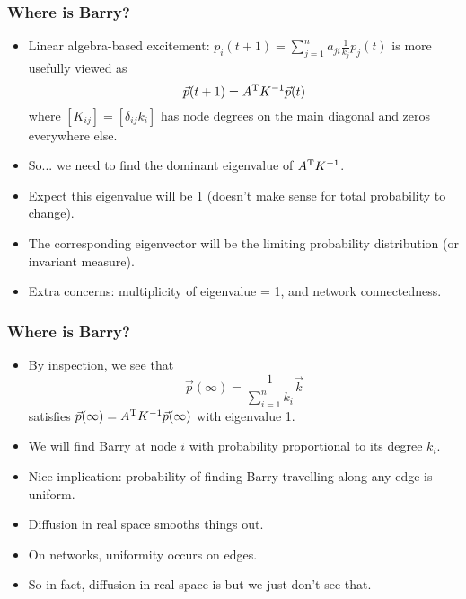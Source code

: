 \begin{frame}
  \frametitle{Where is Barry?}

  \begin{itemize}
  \item<1->
    Linear algebra-based excitement:
    $
    p_i(t+1) = \sum_{j=1}^{n} a_{ji} \frac{1}{k_j} p_j(t)
    $
    is more usefully viewed as
    $$
    \vec{p}(t+1) 
    = 
    A^{\textnormal{T}} K^{-1}
    \vec{p}(t) 
    $$
    where $[K_{ij}] = [\delta_{ij} k_i]$ 
    has node degrees on the main diagonal
    and zeros everywhere else.
  \item<2->
    So... we need to find the \alert{dominant eigenvalue} 
    of $A^{\textnormal{T}} K^{-1}$.
  \item<3->
    Expect this eigenvalue will be 1 (doesn't make sense
    for total probability to change).
  \item<4->
    The corresponding eigenvector will be the limiting
    probability distribution (or invariant measure).
  \item<5->
    Extra concerns: multiplicity of eigenvalue = 1,
    and network connectedness.
  \end{itemize}

\end{frame}

\begin{frame}
  \frametitle{Where is Barry?}

  \begin{itemize}
  \item<1->
    By inspection, we see that
    $$
    \vec{p}(\infty) = \frac{1}{\sum_{i=1}^{n} k_i} \vec{k}
    $$
    satisfies
    $
    \vec{p}(\infty)
    = 
    A^{\textnormal{T}} K^{-1}
    \vec{p}(\infty)
    $
    with eigenvalue 1.
  \item<2->
    We will find Barry at node $i$ with probability
    proportional to its degree $k_i$.
  \item<3->
    Nice implication: probability of finding Barry travelling along
    any edge is \alert{uniform}.
  \item<4->
    Diffusion in real space smooths things out.
  \item<5->
    On networks, uniformity occurs on edges.
  \item<6->
    So in fact, diffusion in real space is 
    but we just don't see that.
  \end{itemize}

\end{frame}

